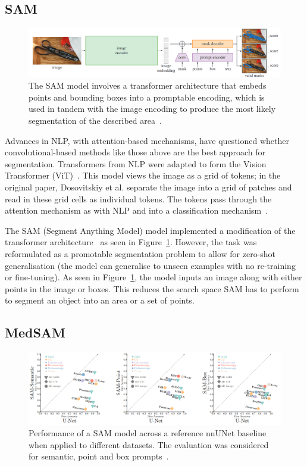 \documentclass[11pt,twoside]{report}
\begin{document}

\subsection{SAM}\label{sect:sam}

\begin{figure}[H]
  \centering
  \includegraphics[width=1\linewidth]{../figures/SAM.png}
  \caption{The SAM model involves a transformer architecture that embeds points and bounding boxes into a promptable encoding, which is used in tandem with the image encoding to produce the most likely segmentation of the described area~\cite{SAM}.}\label{fig:sam}
\end{figure}

Advances in NLP, with attention-based mechanisms, have questioned whether convolutional-based methods like those above are the best approach for segmentation. Transformers from NLP were adapted to form the Vision Transformer (ViT)~\cite{ViT}. This model views the image as a grid of tokens; in the original paper, Dosovitskiy et al. separate the image into a grid of patches and read in these grid cells as individual tokens. The tokens pass through the attention mechanism as with NLP and into a classification mechanism~\cite{ViT}. 

The SAM (Segment Anything Model) model implemented a modification of the transformer architecture~\cite{SAM} as seen in Figure~\ref{fig:sam}. However, the task was reformulated as a promotable segmentation problem to allow for zero-shot generalisation (the model can generalise to unseen examples with no re-training or fine-tuning). As seen in Figure~\ref{fig:sam}, the model inputs an image along with either points in the image or boxes. This reduces the search space SAM has to perform to segment an object into an area or a set of points.

\subsection{MedSAM}\label{sect:medsam}

\begin{figure}[H]
  \centering
  \includegraphics[width=1\linewidth]{../figures/sam-performance.png}
  \caption{Performance of a SAM model across a reference nnUNet baseline when applied to different datasets. The evaluation was considered for semantic, point and box prompts~\cite{he2023computervision}.}\label{fig:sam-performance}
\end{figure}
\end{document}
